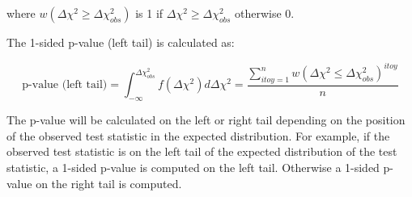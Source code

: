 \begin{itemize}
	where $w(\Delta \chi^2  \geq \Delta \chi^2 _{obs})$ is 1 if $\Delta \chi^2  \geq \Delta \chi^2 _{obs}$ otherwise 0.

	The 1-sided p-value (left tail) is calculated as:

	\begin{equation}
	\text{p-value (left tail)} = \int^{\Delta \chi^2_{obs}}_{-\infty} f(\Delta \chi^2) d \Delta \chi^2  = 
		\frac{ \sum_{ itoy=1 }^{n} w(\Delta \chi^2 \leq \Delta \chi^2_{obs} )^{itoy} }{ n }
	\label{eq:pvalue_rateonly}
	\end{equation}
	
\end{itemize}

The p-value will be calculated on the left or right tail depending on the position of the observed test statistic
in the expected distribution. For example, if the observed test statistic is on the left tail of the expected distribution of the
test statistic, a 1-sided p-value is computed on the left tail. Otherwise a 1-sided p-value on the right tail is computed. 



